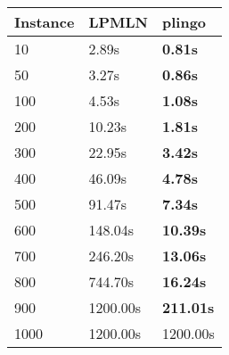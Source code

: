 \begin{tabular}{|l|l|l|}
\toprule
\textbf{Instance} & \textbf{LPMLN} &  \textbf{plingo} \\
\midrule
               10 &          2.89s &   \textbf{0.81s} \\
               50 &          3.27s &   \textbf{0.86s} \\
              100 &          4.53s &   \textbf{1.08s} \\
              200 &         10.23s &   \textbf{1.81s} \\
              300 &         22.95s &   \textbf{3.42s} \\
              400 &         46.09s &   \textbf{4.78s} \\
              500 &         91.47s &   \textbf{7.34s} \\
              600 &        148.04s &  \textbf{10.39s} \\
              700 &        246.20s &  \textbf{13.06s} \\
              800 &        744.70s &  \textbf{16.24s} \\
              900 &       1200.00s & \textbf{211.01s} \\
             1000 &       1200.00s &         1200.00s \\
\bottomrule
\end{tabular}
